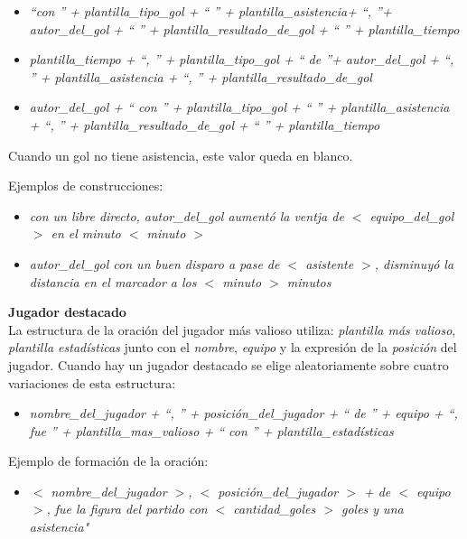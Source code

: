 
    \begin{itemize}
        \item \textit{ “con ” + plantilla\_tipo\_gol + “ ” + plantilla\_asistencia+ “, ”+ autor\_del\_gol + “ ” + plantilla\_resultado\_de\_gol + “ ” + plantilla\_tiempo}
        \item \textit{plantilla\_tiempo + “, ” + plantilla\_tipo\_gol + “ de ”+ autor\_del\_gol + “, ” + plantilla\_asistencia + “, ” + plantilla\_resultado\_de\_gol}
        \item \textit{autor\_del\_gol + “ con ” + plantilla\_tipo\_gol + “ ” + plantilla\_asistencia + “, ” + plantilla\_resultado\_de\_gol + “ ” + plantilla\_tiempo}
    \end{itemize}

    Cuando un gol no tiene asistencia, este valor queda en blanco.

    Ejemplos de construcciones:

    \begin{itemize}
        \item \textit{con un libre directo, autor\_del\_gol aumentó la ventja de $<$ equipo\_del\_gol $>$ en el minuto $<$ minuto $>$}
        \item \textit{autor\_del\_gol con un buen disparo a pase de $<$ asistente $>$, disminuyó la distancia en el marcador a los $<$ minuto $>$ minutos} 
    \end{itemize}

\textbf{Jugador destacado}\\

    La estructura de la oración del jugador más valioso utiliza: \textit{plantilla más valioso}, \textit{plantilla estadísticas} junto con el \textit{nombre}, 
\textit{equipo} y la expresión de la  \textit{posición} del jugador.
    Cuando hay un jugador destacado se elige aleatoriamente sobre cuatro variaciones de esta estructura:
    
    \begin{itemize}
        \item \textit{nombre\_del\_jugador + “, ” + posición\_del\_jugador + “ de ” + equipo + “, fue ” + plantilla\_mas\_valioso + “ con ” +  plantilla\_estadísticas}
    \end{itemize}

    Ejemplo de formación de la oración:

    \begin{itemize}
        \item \textit{$<$ nombre\_del\_jugador $>$, $<$ posición\_del\_jugador $>$ + de $<$ equipo $>$, fue la figura del partido con $<$ cantidad\_goles $>$ goles y una asistencia" }
    \end{itemize}

